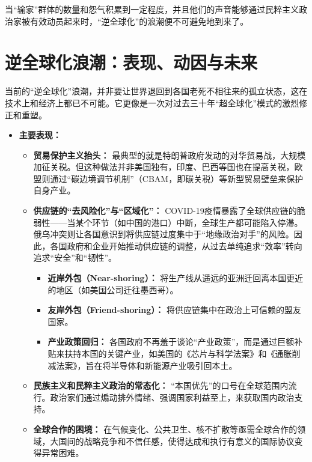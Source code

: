 当“输家”群体的数量和怨气积累到一定程度，并且他们的声音能够通过民粹主义政治家被有效动员起来时，“逆全球化”的浪潮便不可避免地到来了。

\section{逆全球化浪潮：表现、动因与未来}

当前的“逆全球化”浪潮，并非要让世界退回到各国老死不相往来的孤立状态，这在技术上和经济上都已不可能。它更像是一次对过去三十年“超全球化”模式的激烈修正和重塑。

\begin{itemize}
\item \textbf{主要表现：}
\begin{itemize}
\item \textbf{贸易保护主义抬头：} 最典型的就是特朗普政府发动的对华贸易战，大规模加征关税。但这种做法并非美国独有，印度、巴西等国也在提高关税，欧盟则通过“碳边境调节机制”（CBAM，即碳关税）等新型贸易壁垒来保护自身产业。
\item \textbf{供应链的“去风险化”与“区域化”：} COVID-19疫情暴露了全球供应链的脆弱性——当某个环节（如中国的港口）中断，全球生产都可能陷入停滞。俄乌冲突则让各国意识到将供应链过度集中于“地缘政治对手”的风险。因此，各国政府和企业开始推动供应链的调整，从过去单纯追求“效率”转向追求“安全”和“韧性”。
\begin{itemize}
\item \textbf{近岸外包（Near-shoring）：} 将生产线从遥远的亚洲迁回离本国更近的地区（如美国公司迁往墨西哥）。
\item \textbf{友岸外包（Friend-shoring）：} 将供应链集中在政治上可信赖的盟友国家。
\item \textbf{产业政策回归：} 各国政府不再羞于谈论“产业政策”，而是通过巨额补贴来扶持本国的关键产业，如美国的《芯片与科学法案》和《通胀削减法案》，旨在将半导体和新能源产业吸引回本土。
\end{itemize}
\item \textbf{民族主义和民粹主义政治的常态化：} “本国优先”的口号在全球范围内流行。政治家们通过煽动排外情绪、强调国家利益至上，来获取国内政治支持。
\item \textbf{全球合作的困境：} 在气候变化、公共卫生、核不扩散等亟需全球合作的领域，大国间的战略竞争和不信任感，使得达成和执行有意义的国际协议变得异常困难。
\end{itemize}


\end{itemize}
